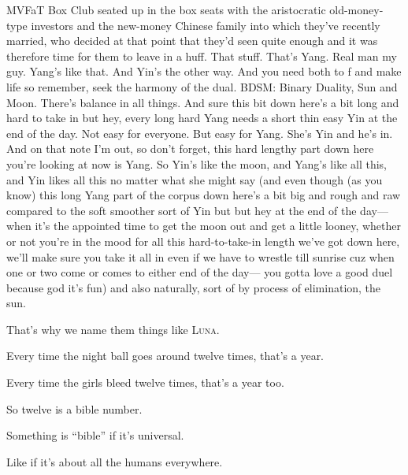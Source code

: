 {{{{				MVFaT Box Club seated up in the box seats with the aristocratic
				old-money-type investors and the new-money Chinese family into
				which they've recently married, who decided at that point that
				they'd seen quite enough and it was therefore time for them to
				leave in a huff.
				That stuff.
				That's Yang.
				Real man  my guy.
				Yang's like that.
				And Yin's the other way.
				And you need both to 
				f and make life
				so remember, seek the harmony of the dual.
				BDSM: Binary Duality, Sun and Moon. There's balance in all things.
				And sure this bit down here's a bit long and hard to take in but hey,
				every long hard Yang needs a short thin easy Yin at the end of the day.
				Not easy for everyone. But easy for Yang. She's Yin and he's in.
				And on that note I'm out, so don't forget, this hard lengthy part
				down here you're looking at now is Yang.
				So Yin's like the moon, and Yang's like all this,
				and Yin likes all this no matter what she might say
				(and even though (as you know) this long Yang part of the
				corpus down here's a bit big and rough and raw compared to
				the soft smoother sort of Yin
				but but hey at the end of the day---%
				when it's the appointed time to get the moon out and get a little looney,
				whether or not you're in the mood for all this hard-to-take-in length
				we've got down here, we'll make sure you take it all in even if we have
				to wrestle till sunrise cuz when one or two come or comes to either end of the day---%
				you gotta love a good duel because god
				 it's fun)
				and also naturally, sort of by process of elimination, the sun.%
					{\!\!}
				}}

                That's why we name them things like \textsc{Luna}.

                Every time the night ball goes around twelve times, that's a year.

                Every time the girls bleed twelve times, that's a year too.

                So twelve is a bible number.

                Something is ``bible'' if it's universal.

                Like if it's about all the humans everywhere.

}}
